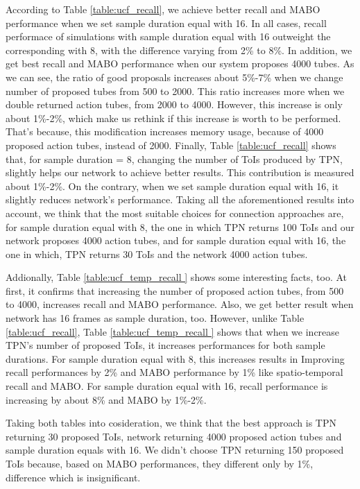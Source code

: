\documentclass{report}
\begin{document}
According to Table \ref{table:ucf_recall}, we achieve better recall and MABO performance when we set sample duration equal with 16.
In all cases,  recall performace of simulations with sample duration equal with 16 outweight the corresponding with 8, with the difference
varying from 2\% to 8\%. In addition, we get best recall and MABO performance when our system proposes 4000 tubes. As we can see,
the ratio of good proposals increases about 5\%-7\% when we change number of proposed tubes from 500 to 2000. This ratio increases more
when we double returned action tubes, from 2000 to 4000. However, this increase is only about 1\%-2\%, which make us rethink if this increase
is worth to be performed. That's because, this modification increases memory usage, because of 4000 proposed action tubes, instead of
2000. Finally, Table \ref{table:ucf_recall} shows that, for sample duration = 8, changing the number of ToIs produced by TPN, slightly
helps our network to achieve better results. This contribution is measured about 1\%-2\%.
On the contrary, when we set sample duration equal with 16, it slightly reduces network's performance. Taking all the aforementioned
results into account, we think that the most suitable choices for connection approaches are, for sample duration equal with 8, the one in
which TPN returns 100 ToIs and our network proposes 4000 action tubes, and for sample duration equal with 16, the one in which,
TPN returns 30 ToIs and the network 4000 action tubes. \par
Addionally, Table \ref{table:ucf_temp_recall } shows some interesting facts, too. At first, it confirms that increasing the number of proposed
action tubes, from 500 to 4000, increases recall and MABO performance. Also, we get better result when network has 16 frames as sample
duration, too. However, unlike Table \ref{table:ucf_recall}, Table \ref{table:ucf_temp_recall } shows that when we increase TPN's number
of proposed ToIs, it increases performances for both sample durations. For sample duration equal with 8, this increases results in Improving
recall performances by 2\% and MABO performance by 1\% like spatio-temporal recall and MABO. For sample duration equal with 16, recall
performance is increasing by about 8\% and MABO by 1\%-2\%.  \par
Taking both tables into cosideration, we think that the best approach is TPN returning 30 proposed ToIs, network returning 4000 proposed
action tubes and sample duration equals with 16. We didn't choose TPN returning 150 proposed ToIs because, based on MABO performances,
they different only by 1\%, difference which is insignificant.
\end{document}
